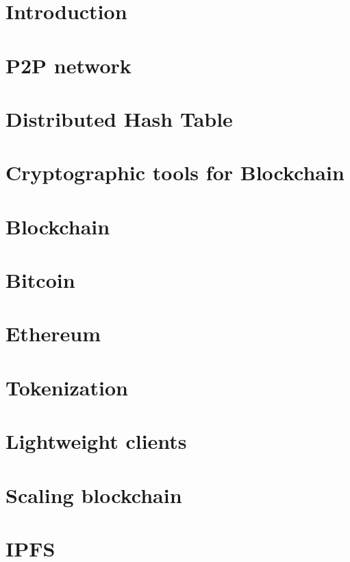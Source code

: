 \documentclass{report}
\begin{document}


\chapter{Introduction}


\chapter{P2P network}


\chapter{Distributed Hash Table}


\chapter{Cryptographic tools for Blockchain}


\chapter{Blockchain}


\chapter{Bitcoin}


\chapter{Ethereum}


\chapter{Tokenization}


\chapter{Lightweight clients}


\chapter{Scaling blockchain}


\chapter{IPFS}


%
\end{document}
